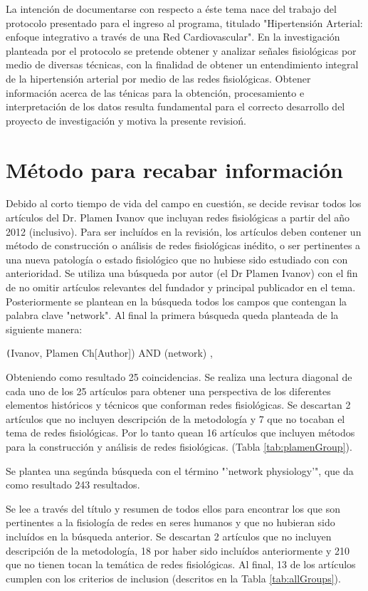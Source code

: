 \documentclass[twoside,twocolumn]{article}
\begin{document}
La intención de documentarse con respecto a éste tema nace del trabajo del protocolo presentado para el ingreso al programa, titulado "Hipertensión Arterial: enfoque integrativo a través de una Red Cardiovascular".
En la investigación planteada por el protocolo se pretende obtener y analizar señales fisiológicas por medio de diversas técnicas, con la finalidad de obtener un entendimiento integral de la hipertensión arterial por medio de las redes fisiológicas.
Obtener información acerca de las ténicas para la obtención, procesamiento e interpretación de los datos resulta fundamental para el correcto desarrollo del proyecto de investigación y motiva la presente revisioń.

\section{Método para recabar información}
Debido al corto tiempo de vida del campo en cuestión, se decide revisar todos los artículos del Dr. Plamen Ivanov que incluyan redes fisiológicas a partir del año 2012 (inclusivo).
Para ser incluídos en la revisión, los artículos deben contener un método de construcción o análisis de redes fisiológicas inédito, o ser pertinentes a una nueva patología o estado fisiológico que no hubiese sido estudiado con con anterioridad.
Se utiliza una búsqueda por autor (el Dr Plamen Ivanov) con el fin de no omitir artículos relevantes del fundador y principal publicador en el tema. Posteriormente se plantean en la búsqueda todos los campos que contengan la palabra clave "network". Al final la primera búsqueda queda planteada de la siguiente manera:

\texttt(Ivanov, Plamen Ch[Author]) AND (network) ,

Obteniendo como resultado 25 coincidencias. Se realiza una lectura diagonal de cada uno de los 25 artículos para obtener una perspectiva de los diferentes elementos históricos y técnicos que conforman redes fisiológicas.
Se descartan 2 artículos que no incluyen descripción de la metodología y 7 que no tocaban el tema de redes fisiológicas. Por lo tanto quean 16 artículos que incluyen métodos para la construcción y análisis de redes fisiológicas. (Tabla \ref{tab:plamenGroup}).

Se plantea una segúnda búsqueda con el término "'network physiology'", que da como resultado 243 resultados.

Se lee a través del título y resumen de todos ellos para  encontrar los que son pertinentes a la fisiología de redes en seres humanos y que no hubieran sido incluídos en la búsqueda anterior.
Se descartan 2 artículos que no incluyen descripción de la metodología, 18 por haber sido incluídos anteriormente y 210 que no tienen tocan la temática de redes fisiológicas.
Al final, 13 de los artículos cumplen con los criterios de inclusion (descritos en la Tabla \ref{tab:allGroups}).
\end{document}
